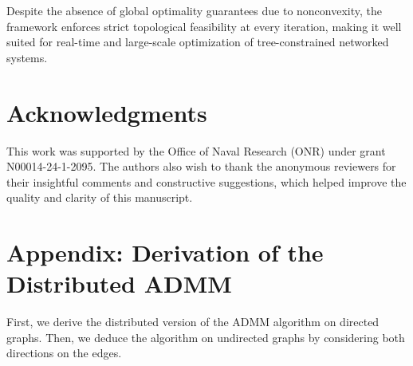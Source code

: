 \documentclass[11pt,a4paper]{article}
\theoremstyle{plain}
\theoremstyle{definition}
\theoremstyle{remark}
\begin{document}
Despite the absence of global optimality guarantees due to nonconvexity, the framework enforces strict topological feasibility at every iteration, making it well suited for real-time and large-scale optimization of tree-constrained networked systems.
	
	
	
	\section*{Acknowledgments}
	
	This work was supported by the Office of Naval Research (ONR) under grant N00014-24-1-2095. The authors also wish to thank the anonymous reviewers for their insightful comments and constructive suggestions, which helped improve the quality and clarity of this manuscript.
	
	
	\section*{Appendix: Derivation of the Distributed ADMM}\label{Appendix}
	
	First, we derive the distributed version of the ADMM algorithm on directed	graphs. Then, we deduce the algorithm on undirected graphs by considering	both directions on the edges.
	
\end{document}
